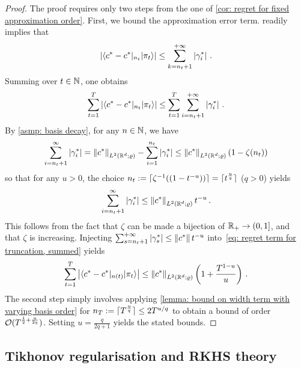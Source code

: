 \begin{proof}
    The proof requires only two steps from the one of \cref{cor: regret for fixed approximation order}. First, we bound the approximation error term.
     readily implies that
    \[
        \left\lvert \langle c^* - c^*\vert_{n_t}\vert \pi_t\rangle \right\rvert \le \sum_{k=n_t+1}^{+\infty}\left\lvert \gamma_i^* \right\rvert\,.
    \]
    Summing over $t\in\mathbb{N}$, one obtains
    \begin{align}
        \sum_{t=1}^T \left\lvert \langle c^* - c^*\vert_{n_t}\vert \pi_t\rangle \right\rvert\le \sum_{t=1}^T \sum_{i=n_t+1}^{+\infty}\left\lvert \gamma_i^* \right\rvert\,.\label{eq: regret term for truncation, summed}
    \end{align}
    By \cref{asmp: basis decay}, for any $n\in\mathbb{N}$, we have
    \[ 
        \sum_{i=n_t+1}^\infty\left\lvert \gamma_i^* \right\rvert = \left\lVert c^*\right\rVert_{L^2(\mathbb{R}^d;\varrho)}- \sum_{i=1}^{n_t}\left\lvert \gamma_i^* \right\rvert \le \left\lVert c^*\right\rVert_{L^2(\mathbb{R}^d;\varrho)}(1-\zeta(n_t))
    \]
    so that for any $u>0$, the choice $n_t:=\lceil\zeta^{-1}((1-t^{-u}))\rceil=\lceil t^{\frac uq}\rceil$ ($q>0$) yields
    \[
        \sum_{i=n_t+1}^\infty \left\lvert \gamma_i^* \right\rvert\le  \left\lVert c^*\right\rVert_{L^2(\mathbb{R}^d;\varrho)} t^{-u}\,.
    \]
    This follows from the fact that $\zeta$ can be made a bijection of $\mathbb{R}_+\to(0,1]$, and that $\zeta$ is increasing. Injecting $\sum_{s=n_t+1}^{+\infty}\left\lvert \gamma_s^* \right\rvert\le \left\lVert c^*\right\rVert t^{-u}$ into~\eqref{eq: regret term for truncation, summed} yields
    \[
        \sum_{t=1}^T \left\lvert \langle c^* - c^*\vert_{n(t)}\vert \pi_t\rangle \right\rvert\le\left\lVert c^*\right\rVert_{L^2(\mathbb{R}^d;\varrho)}\left(1+\frac{T^{1-u}}u\right)\,.
    \]
    The second step simply involves applying \cref{lemma: bound on width term with varying basis order} for $n_T:=\lceil T^{\frac{u}q}\rceil\le 2T^{u/q}$ to obtain a bound of order $\mathcal{O}(T^{\frac12+\frac{u}{2q}})$. Setting $u=\frac{q}{2q+1}$ yields the stated bounds.
\end{proof}





\subsection{Tikhonov regularisation and RKHS theory}\label{subsec: tikhonov and RKHS}

